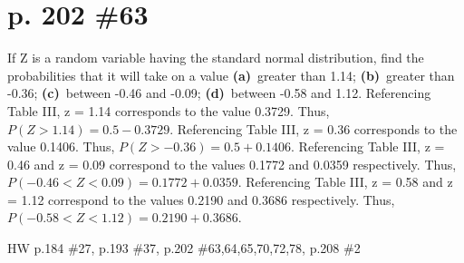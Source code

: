\documentclass[12pt]{article}
\begin{document}
	\section[20pt]{p. 202 \#63}
	If Z is a random variable having the standard normal distribution, find the probabilities that it will take on a value \newline
	\textbf{(a)}\ greater than 1.14; \newline
	\textbf{(b)}\ greater than -0.36; \newline
	\textbf{(c)}\ between -0.46 and -0.09; \newline
	\textbf{(d)}\ between -0.58 and 1.12. \newline \newline
	Referencing Table III, z = 1.14 corresponds to the value 0.3729. Thus, \(P(Z>1.14)=0.5-0.3729\). \newline
	\newline
	\newline
	Referencing Table III, z = 0.36 corresponds to the value 0.1406. Thus, \(P(Z>-0.36)=0.5+0.1406\). \newline
	\newline
	\newline
	Referencing Table III, z = 0.46 and z = 0.09 correspond to the values 0.1772 and 0.0359 respectively. Thus, \(P(-0.46<Z<0.09)=0.1772+0.0359\). \newline
	\newline
	\newline
	Referencing Table III, z = 0.58 and z = 1.12 correspond to the values 0.2190 and 0.3686 respectively. Thus, \(P(-0.58<Z<1.12)=0.2190+0.3686\). \newline
	\newpage
	\maketitle HW p.184 \#27, p.193 \#37, p.202 \#63,64,65,70,72,78, p.208 \#2
\end{document}
